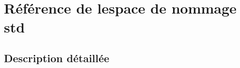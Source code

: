\hypertarget{namespacestd}{}\section{Référence de l\textquotesingle{}espace de nommage std}
\label{namespacestd}


\subsection{Description détaillée}
